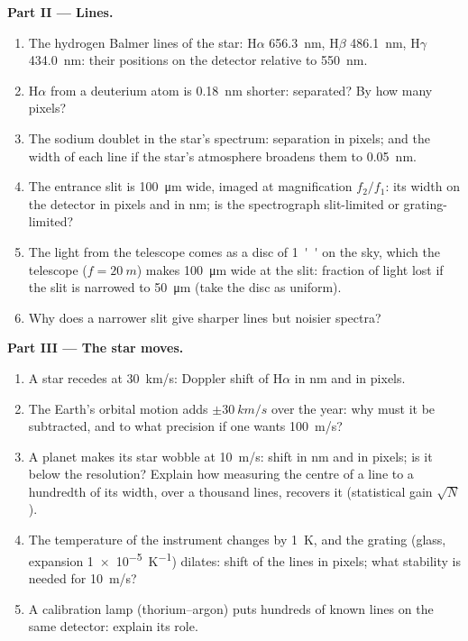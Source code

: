 \begin{problem}
\medskip
\noindent\textbf{Part II --- Lines.}
\begin{enumerate}[resume]
  \item The hydrogen Balmer lines of the star: H$\alpha$ \qty{656.3}{nm},
        H$\beta$ \qty{486.1}{nm}, H$\gamma$ \qty{434.0}{nm}: their positions on the
        detector relative to \qty{550}{nm}.
  \item H$\alpha$ from a deuterium atom is \qty{0.18}{nm} shorter: separated?
        By how many pixels?
  \item The sodium doublet in the star's spectrum: separation in
        pixels; and the width of each line if the star's atmosphere
        broadens them to \qty{0.05}{nm}.
  \item The entrance slit is \qty{100}{\micro m} wide, imaged at
        magnification $f_2/f_1$: its width on the detector in pixels and
        in nm; is the spectrograph slit-limited or grating-limited?
  \item The light from the telescope comes as a disc of \qty{1}{''} on
        the sky, which the telescope ($f = \qty{20}{m}$) makes \qty{100}{\micro m}
        wide at the slit: fraction of light lost if the slit is
        narrowed to \qty{50}{\micro m} (take the disc as uniform).
  \item Why does a narrower slit give sharper lines but noisier
        spectra?
\end{enumerate}

\medskip
\noindent\textbf{Part III --- The star moves.}
\begin{enumerate}[resume]
  \item A star recedes at \qty{30}{km/s}: Doppler shift of H$\alpha$ in nm
        and in pixels.
  \item The Earth's orbital motion adds $\pm\qty{30}{km/s}$ over the year:
        why must it be subtracted, and to what precision if one wants
        \qty{100}{m/s}?
  \item A planet makes its star wobble at \qty{10}{m/s}: shift in nm and
        in pixels; is it below the resolution? Explain how measuring
        the centre of a line to a hundredth of its width, over a
        thousand lines, recovers it (statistical gain $\sqrt{N}$).
  \item The temperature of the instrument changes by \qty{1}{K}, and the
        grating (glass, expansion \qty{1e-5}{K^{-1}}) dilates: shift of the
        lines in pixels; what stability is needed for \qty{10}{m/s}?
  \item A calibration lamp (thorium--argon) puts hundreds of known
        lines on the same detector: explain its role.
\end{enumerate}


\end{problem}
